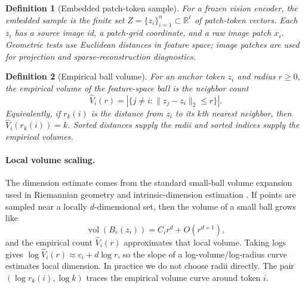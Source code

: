 \documentclass{article}
\newcommand{\R}{\mathbb{R}}
\newcommand{\vol}{\operatorname{vol}}
\newtheorem{definition}{Definition}
\begin{document}
\begin{definition}[Embedded patch-token sample]
For a frozen vision encoder, the embedded sample is the finite set $Z=\{z_i\}_{i=1}^n\subset \R^\ell$ of patch-token vectors. Each $z_i$ has a source image id, a patch-grid coordinate, and a raw image patch $x_i$. Geometric tests use Euclidean distances in feature space; image patches are used for projection and sparse-reconstruction diagnostics.
\end{definition}

\begin{definition}[Empirical ball volume]
For an anchor token $z_i$ and radius $r\ge0$, the empirical volume of the feature-space ball is the neighbor count
\begin{equation}
  \widehat{V}_i(r)
  =
  \left|\{j\ne i:\|z_j-z_i\|_2\le r\}\right|.
\end{equation}
Equivalently, if $r_k(i)$ is the distance from $z_i$ to its $k$th nearest neighbor, then $\widehat{V}_i(r_k(i))=k$. Sorted distances supply the radii and sorted indices supply the empirical volumes.
\end{definition}

\paragraph{Local volume scaling.}
The dimension estimate comes from the standard small-ball volume expansion used in Riemannian geometry and intrinsic-dimension estimation \citep{gray1974volume,tenenbaum2000global,levina2005maximum,facco2017estimating}. If points are sampled near a locally $d$-dimensional set, then the volume of a small ball grows like
\begin{equation}
  \vol(B_r(z_i)) = C_i r^d + O(r^{d+1}),
\end{equation}
and the empirical count $\widehat{V}_i(r)$ approximates that local volume. Taking logs gives $\log \widehat{V}_i(r) \approx c_i + d\log r$, so the slope of a log-volume/log-radius curve estimates local dimension. In practice we do not choose radii directly. The pair $(\log r_k(i), \log k)$ traces the empirical volume curve around token $i$.
\end{document}
